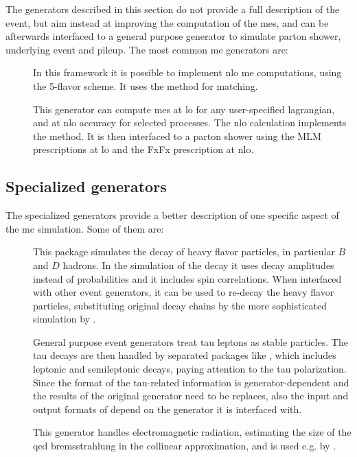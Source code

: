 The generators described in this section do not provide a full description of the event, but aim instead at improving the 
computation of the \glspl{me}, and can be afterwards interfaced to a general purpose generator to simulate parton shower, underlying event and pileup. The most common \gls{me} generators are:

\begin{description}
\item[\PowhegBox] \cite{Alioli:2010xd} In this framework it is possible to implement \gls{nlo} \gls{me} computations, using the 5-flavor scheme.
It uses the \Powheg method for matching. 

\item[\aNLO] \cite{Alwall:2014hca} This generator can compute \glspl{me} at \gls{lo} for any user-specified lagrangian, and at \gls{nlo} accuracy for selected processes. %
The \gls{nlo} calculation implements the \mcatnlo method. 
It is then interfaced to a parton shower using the 
MLM prescriptions at \gls{lo} and the FxFx prescription at \gls{nlo}.

\end{description}

\subsection{Specialized generators}

The specialized generators provide a better description of one specific aspect of the \gls{mc} simulation. Some of them are:

\begin{description}
\item[\evtgen] \cite{Lange:2001uf} This package simulates the decay of heavy flavor particles, in particular $B$ and $D$ hadrons. 
In the simulation of the decay it uses decay amplitudes instead of probabilities and it includes spin correlations. 
When interfaced with other event generators, it can be used to re-decay the heavy flavor particles, 
substituting original decay chains by the more sophisticated simulation by \evtgen.

\item[\tauola] \cite{Jadach:1990mz} General purpose event generators treat tau leptons as stable particles. 
The tau decays are then handled by separated packages like \tauola, which includes leptonic and semileptonic decays, paying attention to the tau polarization. Since the format of the tau-related information is generator-dependent and the results of the original generator need to be replaces, also the input and output formats of \tauola depend on the generator it is interfaced with.

\item[\photos] \cite{Barberio:1990ms} This generator handles electromagnetic radiation, estimating the size of the \gls{qed} bremsstrahlung in the collinear approximation, and is used e.g. by \tauola. 


\end{description}


